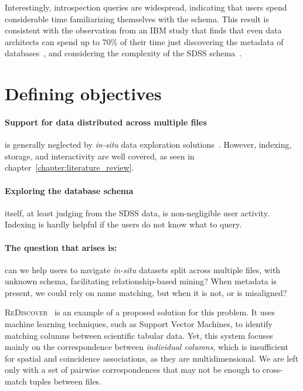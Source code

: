 Interestingly, introspection queries are widespread, indicating that users spend considerable time
familiarizing themselves with the schema. This result is consistent with the observation from an IBM
study that finds that even data architects can spend up to 70\% of their time just discovering the
metadata of databases~\cite{Wu2008}, and considering the complexity of the SDSS schema~\cite{Khoussainova2010}.

\section{Defining objectives}
\label{sec:objectives}

\paragraph{Support for data distributed across multiple files} is generally neglected by
\textit{in-situ} data exploration solutions~\cite{Silva2016}. However, indexing, storage,
and interactivity are well covered, as seen in chapter~\ref{chapter:literature_review}.

\paragraph{Exploring the database schema} itself, at least judging from the \gls{SDSS} data,
is non-negligible user activity. Indexing is hardly helpful if the users do not know what to query.

\paragraph{The question that arises is:} can we help users to navigate \textit{in-situ} datasets
split across multiple files, with unknown schema, facilitating relationship-based mining?
When metadata is present, we could rely on name matching, but when it is not, or is misaligned?

\textsc{ReDiscover}~\cite{alawini2016} is an example of a proposed solution for this problem.
It uses machine learning techniques, such as Support Vector Machines, to identify matching
columns between scientific tabular data.
Yet, this system focuses mainly on the correspondence between \emph{individual columns},
which is insufficient for spatial and coincidence associations, as they are multidimensional.
We are left only with a set of pairwise correspondences that may not be enough to cross-match
tuples between files.

